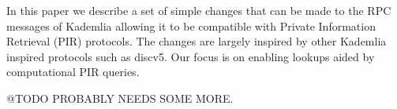 In this paper we describe a set of simple changes that can be made to the RPC messages of Kademlia\cite{kademlia} allowing it to be compatible with Private Information Retrieval (PIR) protocols. The changes are largely inspired by other Kademlia inspired protocols such as discv5\cite{discv5}. Our focus is on enabling lookups aided by computational PIR queries.

@TODO PROBABLY NEEDS SOME MORE.